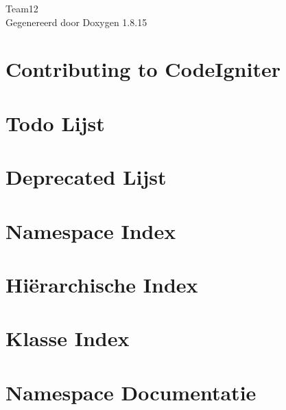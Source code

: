 \let\mypdfximage\pdfximage\def\pdfximage{\immediate\mypdfximage}\documentclass[twoside]{book}
\newcommand{\+}{\discretionary{\mbox{\scriptsize$\hookleftarrow$}}{}{}}
\newcommand{\clearemptydoublepage}{%
  \newpage{\pagestyle{empty}\cleardoublepage}%
}
\begin{document}
\hypersetup{pageanchor=false,
             bookmarksnumbered=true,
             pdfencoding=unicode
            }
\begin{titlepage}
\vspace*{7cm}
\begin{center}%
{\Large Team12 }\\
\vspace*{1cm}
{\large Gegenereerd door Doxygen 1.8.15}\\
\end{center}
\end{titlepage}
\clearemptydoublepage
{}
\tableofcontents
\clearemptydoublepage
{}
\hypersetup{pageanchor=true}

\chapter{Contributing to Code\+Igniter}
\label{md_contributing}

\chapter{Todo Lijst}
\label{todo}

\chapter{Deprecated Lijst}
\label{deprecated}

\chapter{Namespace Index}

\chapter{Hi\"{e}rarchische Index}

\chapter{Klasse Index}

\chapter{Namespace Documentatie}

\end{document}
